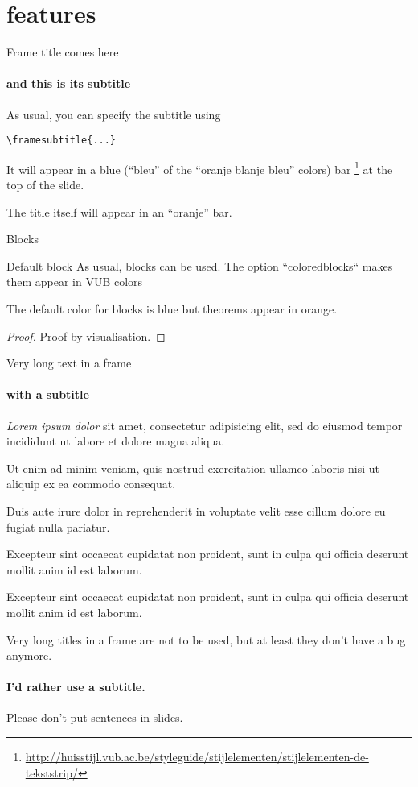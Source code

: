 \documentclass{beamer}
\begin{document}
\section{features}

\begin{frame}[fragile]{Frame title comes here}
\framesubtitle{and this is its subtitle}
As usual, you can specify the subtitle using

\begin{verbatim}
\framesubtitle{...}
\end{verbatim}

It will appear in a blue (``bleu'' of the ``oranje blanje bleu'' colors) bar
\footnote{\url{http://huisstijl.vub.ac.be/styleguide/stijlelementen/stijlelementen-de-tekststrip/}}
at the top of the slide.

\smallskip

The title itself will appear in an ``oranje'' bar.
\end{frame}

\begin{frame}{Blocks}
\begin{block}{Default block}
  As usual, blocks can be used. The option ``coloredblocks`` makes them appear in VUB colors
  \end{block}
 \begin{theorem}
  The default color for blocks is blue but theorems appear in orange. 
 \end{theorem}
 \begin{proof}
  Proof by visualisation. 
 \end{proof}



\end{frame}



\begin{frame}{Very long text in a frame}
  \framesubtitle{with a subtitle}
  \emph{Lorem ipsum dolor} sit amet, consectetur adipisicing elit, sed do eiusmod tempor incididunt ut labore et dolore magna aliqua.

  \bigskip

  Ut enim ad minim veniam, quis nostrud exercitation ullamco laboris nisi ut aliquip ex ea commodo consequat.

  \bigskip

  Duis aute irure dolor in reprehenderit in voluptate velit esse cillum dolore eu fugiat nulla pariatur.

  \bigskip

  Excepteur sint occaecat cupidatat non proident, sunt in culpa qui officia deserunt mollit anim id est laborum.

  \bigskip

  Excepteur sint occaecat cupidatat non proident, sunt in culpa qui officia deserunt mollit anim id est laborum.
\end{frame}

\begin{frame}{Very long titles in a frame are not to be used, but at least they don't have a bug anymore.}
  \framesubtitle{I'd rather use a subtitle.}
  Please don't put sentences in slides.
\end{frame}
\end{document}
